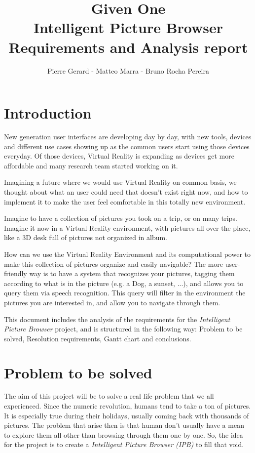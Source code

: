 \documentclass[11pt,a4paper]{article}
\author{Pierre Gerard - Matteo Marra - Bruno Rocha Pereira}
\title{Given One \\ Intelligent Picture Browser \\ Requirements and Analysis report}
\begin{document}
\maketitle

\section{Introduction}
New generation user interfaces are developing day by day, with new tools, devices and different use cases showing up as the common users start using those devices everyday.
Of those devices, Virtual Reality is expanding as devices get more affordable and many research team started working on it. 

Imagining a future where we would use Virtual Reality on common basis, we thought about what an user could need that doesn't exist right now, and how to implement it to make the user feel comfortable in this totally new environment.

Imagine to have a collection of pictures you took on a trip, or on many trips. Imagine it now in a Virtual Reality environment, with pictures all over the place, like a 3D desk full of pictures not organized in album.

How can we use the Virtual Reality Environment and its computational power to make this collection of pictures organize and easily navigable?
The more user-friendly way is to have a system that recognizes your pictures, tagging them according to what is in the picture (e.g. a Dog, a sunset, ...), and allows you to query them via speech recognition. This query will filter in the environment the pictures you are interested in, and allow you to navigate through them.

This document includes the analysis of the requirements for the \textit{Intelligent Picture Browser} project, and is structured in the following way: Problem to be solved, Resolution requirements, Gantt chart and conclusions.

\section{Problem to be solved}

The aim of this project will be to solve a real life problem that we all experienced. Since the numeric revolution, humans tend to take a ton of pictures. It is especially true during their holidays, usually coming back with thousands of pictures. The problem that arise then is that human don't usually have a mean to explore them all other than browsing through them one by one. So, the idea for the project is to create a \textit{Intelligent Picture Browser (IPB)} to fill that void.
 
\end{document}
